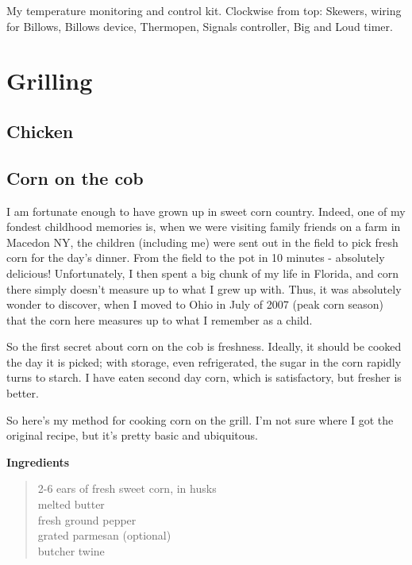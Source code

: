 \documentclass[
]{book}
\begin{document}
My temperature monitoring and control kit. Clockwise from top: Skewers, wiring for Billows, Billows device, Thermopen, Signals controller, Big and Loud timer.

\hypertarget{grill}{%
\section{Grilling}\label{grill}}

\hypertarget{chicken}{%
\subsection{Chicken}\label{chicken}}

\hypertarget{corn}{%
\subsection{Corn on the cob}\label{corn}}

I am fortunate enough to have grown up in sweet corn country. Indeed, one of my fondest childhood memories is, when we were visiting family friends on a farm in Macedon NY, the children (including me) were sent out in the field to pick fresh corn for the day's dinner. From the field to the pot in 10 minutes - absolutely delicious! Unfortunately, I then spent a big chunk of my life in Florida, and corn there simply doesn't measure up to what I grew up with. Thus, it was absolutely wonder to discover, when I moved to Ohio in July of 2007 (peak corn season) that the corn here measures up to what I remember as a child.

So the first secret about corn on the cob is freshness. Ideally, it should be cooked the day it is picked; with storage, even refrigerated, the sugar in the corn rapidly turns to starch. I have eaten second day corn, which is satisfactory, but fresher is better.

So here's my method for cooking corn on the grill. I'm not sure where I got the original recipe, but it's pretty basic and ubiquitous.

\textbf{Ingredients}

\begin{quote}
2-6 ears of fresh sweet corn, in husks\\
melted butter\\
fresh ground pepper\\
grated parmesan (optional)\\
butcher twine
\end{quote}
\end{document}
